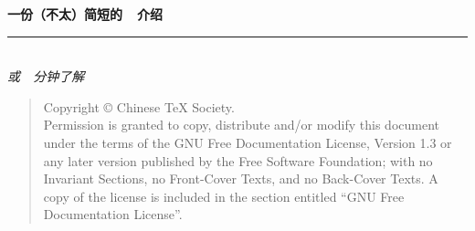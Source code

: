 \thispagestyle{empty}

\noindent\begin{minipage}{\textwidth}
\raggedleft
{\huge \bfseries 一份（不太）简短的~\LaTeXe{}~介绍}
\noindent\rule[-1ex]{\textwidth}{5pt}\\[2.5ex]
\hfill\emph{\Large 或~\pageref{lshort-minutes}~分钟了解~\LaTeXe}
\end{minipage}

\noindent{}


\newpage\thispagestyle{empty}
\begin{quote}\footnotesize
    Copyright \copyright{} {\the\year} Chinese \TeX{} Society. \\
    Permission is granted to copy, distribute and/or modify this document
    under the terms of the GNU Free Documentation License, Version 1.3
    or any later version published by the Free Software Foundation;
    with no Invariant Sections, no Front-Cover Texts, and no Back-Cover Texts.
    A copy of the license is included in the section entitled ``GNU
    Free Documentation License''.
\end{quote}
